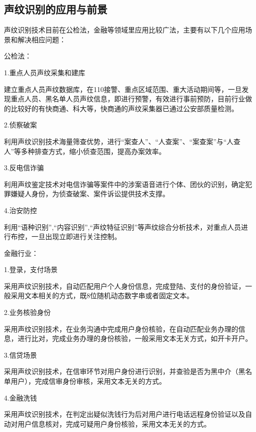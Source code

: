 \documentclass{article}
\begin{document}
\subsection{声纹识别的应用与前景}
声纹识别技术目前在公检法，金融等领域里应用比较广法，主要有以下几个应用场景和解决相应问题：\par 
公检法：\par 
1.重点人员声纹采集和建库\par 
建立重点人员声纹数据库，在110接警、重点区域范围、重大活动期间等，一旦发现重点人员、黑名单人员声纹信息，即进行预警，有效进行事前预防，目前行业做的比较好的有快商通、科大等，快商通的声纹采集器已通过公安部质量检测。\par 
2.侦察破案\par 
利用声纹识别技术海量筛查优势，进行“案查人”、“人查案”、“案查案”与“人查人”等多种排查方式，缩小侦查范围，提高办案效率。\par 
3.反电信诈骗\par 
利用声纹鉴定技术对电信诈骗等案件中的涉案语音进行个体、团伙的识别，确定犯罪嫌疑人身份，为侦查破案、案件诉讼提供技术支撑。\par 
4.治安防控\par 
利用“语种识别”,“内容识别”,“声纹特征识别”等声纹综合分析技术，对重点人员进行布控，一旦出现立即进行关注控制。\par 
金融行业：\par 
1.登录，支付场景\par 
采用声纹识别技术，自动匹配用户个人身份信息，完成登陆、支付的身份验证，一般采用文本相关的方式，既8位随机动态数字串或者固定文本。\par 
2.业务核验身份\par 
采用声纹识别技术，在业务沟通中完成用户身份核验，在自动匹配业务办理的信息，进行比对，完成业务办理的身份核验，一般采用文本无关方式，如开卡开户。\par 
3.信贷场景\par 
采用声纹识别技术，在信审环节对用户身份进行识别，并查验是否为黑中介（黑名单用户），完成信审身份审核，采用文本无关的方式。\par 
4.金融洗钱\par 
采用声纹识别技术，在判定出疑似洗钱行为后对用户进行电话远程身份验证以及自动对用户信息核对，完成可疑用户身份核验，采用文本无关的方式。\par 
\end{document}
